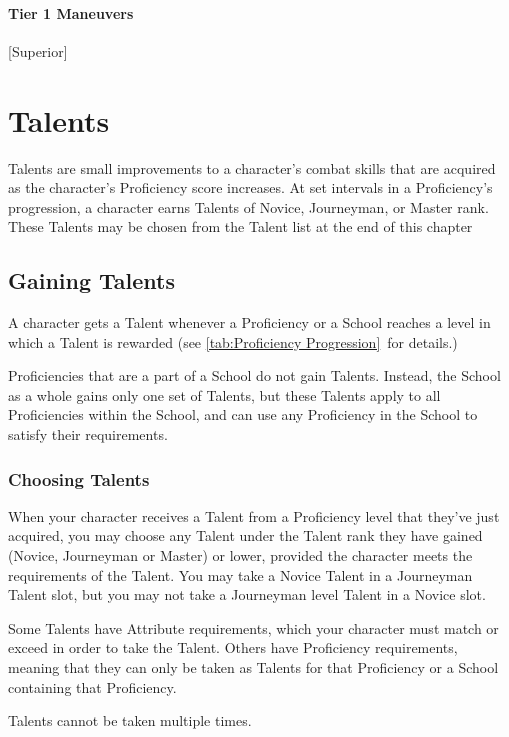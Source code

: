 \documentclass[oneside,11pt,english]{book}
\begin{document}
\subsubsection{Tier 1 Maneuvers}
 [Superior]

\chapter{Talents}\label{ch:Talents} %
\startcontents[chapters]
\clearpage
Talents are small improvements to a character’s combat skills that are acquired as the character’s Proficiency score increases. At set intervals in a Proficiency’s progression, a character earns Talents of Novice, Journeyman, or Master rank. These Talents may be chosen from the Talent list at the end of this chapter

\section{Gaining Talents}
A character gets a Talent whenever a Proficiency or a School reaches a level in which a Talent is 
rewarded (see \autoref{tab:Proficiency Progression}~for details.)

Proficiencies that are a part of a School do not gain Talents. Instead, the School as a whole gains only one 
set of Talents, but these Talents apply to all Proficiencies within the School, and can use any Proficiency 
in the School to satisfy their requirements. 

\subsection{Choosing Talents}
When your character receives a Talent from a Proficiency level that they’ve just acquired, you may choose any Talent under the Talent rank they have gained (Novice, Journeyman or Master) or lower, provided the character meets the requirements of the Talent. You may take a Novice Talent in a Journeyman Talent slot, but you may not take a Journeyman level Talent in a Novice slot.

Some Talents have Attribute requirements, which your character must match or exceed in order to take the Talent. Others have Proficiency requirements, meaning that they can only be taken as Talents for that Proficiency or a School containing that Proficiency.

Talents cannot be taken multiple times.
\end{document}
